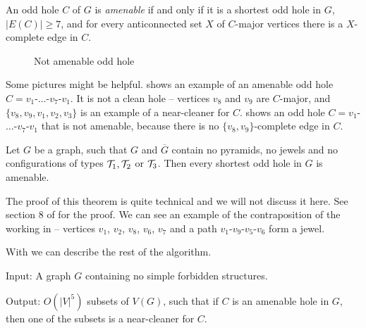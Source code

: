 \begin{defn}
  An odd hole $C$ of $G$ is \emph{amenable} if and only if it is a shortest odd hole in $G$, $|E(C)| \geq 7$, and for every anticonnected set $X$ of $C$-major vertices there is a $X$-complete edge in $C$.
\end{defn}

\begin{figure}
  \begin{minipage}{.5\textwidth}
      
			\label{fig:amenableOddHole}
  \end{minipage}%
  \begin{minipage}{.5\textwidth}
      
			\caption{Not amenable odd hole}
			\label{fig:notAmenableHole}
  \end{minipage}
  \end{figure}

Some pictures might be helpful.  shows an example of an amenable odd hole $C = v_1$-$\ldots$-$v_7$-$v_1$. It is not a clean hole -- vertices $v_8$ and $v_9$ are $C$-major, and $\{v_8, v_9, v_1, v_2, v_3\}$ is an example of a near-cleaner for $C$.
 shows an odd hole $C = v_1$-$\ldots$-$v_7$-$v_1$ that is not amenable, because there is no $\{v_8, v_9\}$-complete edge in $C$.

\begin{theorem}
	\label{thm:amenableHoles}
	Let $G$ be a graph, such that $G$ and $\overline{G}$ contain no pyramids, no jewels and no configurations of types $\mathcal{T}_1, \mathcal{T}_2$ or $\mathcal{T}_3$. Then every shortest odd hole in $G$ is amenable.
\end{theorem}

The proof of this theorem is quite technical and we will not discuss it here. See section 8 of \cite{MC05} for the proof. We can see an example of the contraposition of the  working in  -- vertices $v_1$, $v_2$, $v_8$, $v_6$, $v_7$ and a path $v_1$-$v_9$-$v_5$-$v_6$ form a jewel.

With  we can describe the rest of the algorithm.

\begin{alg}
	\label{alg:listNearCleaners}
	Input: A graph $G$ containing no simple forbidden structures.

	\noindent Output: $O(|V|^5)$ subsets of $V(G)$, such that if $C$ is an amenable hole in $G$, then one of the subsets is a near-cleaner for $C$.
\end{alg}


